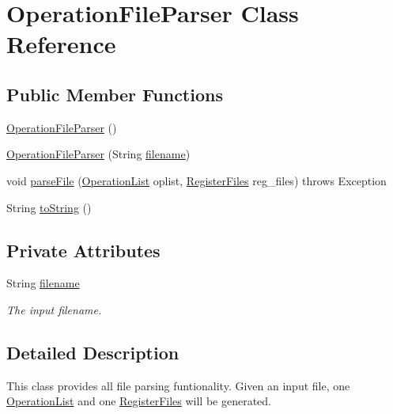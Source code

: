 \hypertarget{classOperationFileParser}{
\section{OperationFileParser Class Reference}
\label{classOperationFileParser}
}
\subsection*{Public Member Functions}
\begin{DoxyCompactItemize}
\item 
\hyperlink{classOperationFileParser_aae642f641952d9299ae1d18c2a98e257}{OperationFileParser} ()
\item 
\hyperlink{classOperationFileParser_ab3cf3d1b41d42f6ce2a843fbe11a5f9a}{OperationFileParser} (String \hyperlink{classOperationFileParser_a02c7ed52d4be7f9a23054eebcff0a96e}{filename})
\item 
void \hyperlink{classOperationFileParser_af360317f51081606c8fb05b658be8d00}{parseFile} (\hyperlink{classOperationList}{OperationList} oplist, \hyperlink{classRegisterFiles}{RegisterFiles} reg\_\-files)  throws Exception
\item 
String \hyperlink{classOperationFileParser_af6e91ca0ed2166c6b75ad12574dc5341}{toString} ()
\end{DoxyCompactItemize}
\subsection*{Private Attributes}
\begin{DoxyCompactItemize}
\item 
String \hyperlink{classOperationFileParser_a02c7ed52d4be7f9a23054eebcff0a96e}{filename}
\begin{DoxyCompactList}\small\item\em The input filename. \item\end{DoxyCompactList}\end{DoxyCompactItemize}


\subsection{Detailed Description}
This class provides all file parsing funtionality. Given an input file, one \hyperlink{classOperationList}{OperationList} and one \hyperlink{classRegisterFiles}{RegisterFiles} will be generated. 

